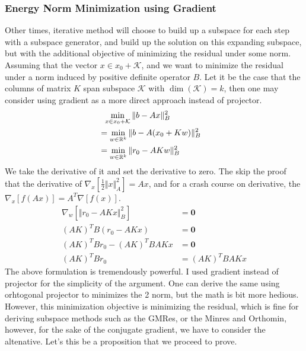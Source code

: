 \documentclass[]{article}
\theoremstyle{definition}
\begin{document}
        \subsubsection{Energy Norm Minimization using Gradient}\label{sec:1.4}
            Other times, iterative method will choose to build up a subspace for each step with a subspace generator, and build up the solution on this expanding subspace, but with the additional objective of minimizing the residual under some norm. Assuming that the vector $x\in x_0 + \mathcal{K}$, and we want to minimize the residual under a norm induced by positive definite operator $B$. Let it be the case that the columns of matrix $K$ span subspace $\mathcal{K}$ with $\dim(\mathcal K) = k$, then one may consider using gradient as a more direct approach instead of projector. 
            \begin{align}
                &\hspace{0.6em} \min_{x\in x_0 + \mathcal{K}} \Vert b - Ax\Vert_B^2 
                \\
                &= \min_{w\in \mathbb{R}^{k}} 
                \Vert b - A(x_0 + Kw)\Vert_B^2 & 
                \\
                &= \min_{w\in \mathbb{R}^{k}} 
                \Vert 
                    r_0 - AKw
                \Vert_B^2
            \end{align}
            We take the derivative of it and set the derivative to zero. The skip the proof that the derivative of $\nabla_x[\frac{1}{2}\Vert x\Vert_A^2] = Ax$, and for a crash course on derivative, the $\nabla_x[f(Ax)] = A^T\nabla [f(x)]$. 
            \begin{align}
                \nabla_w \left[
                    \Vert r_0 - AKx\Vert_B^2
                \right] &= \mathbf{0}
                \\
                (AK)^TB(r_0 - AKx) &= \mathbf{0}
                \\
                (AK)^TBr_0 - (AK)^TBAKx &= \mathbf{0}
                \\
                (AK)^TBr_0 &= (AK)^TBAKx
            \end{align}
            The above formulation is tremendously powerful. I used gradient instead of projector for the simplicity of the argument. One can derive the same using orhtogonal projector to minimizes the 2 norm, but the math is bit more hedious. However, this minimization objective is minimizing the residual, which is fine for deriving subspace methods such as the GMRes, or the Minres and Orthomin, however, for the sake of the conjugate gradient, we have to consider the altenative. Let's this be a proposition that we proceed to prove. 
\end{document}

